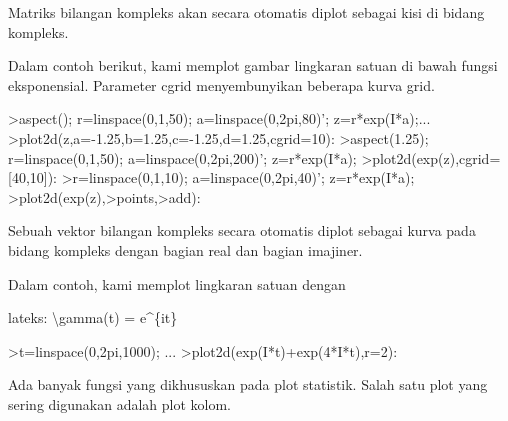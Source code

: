\documentclass[a4paper,10pt]{article}
\begin{document}
\begin{eulernotebook}
\begin{eulercomment}
\begin{eulercomment}
\begin{eulercomment}
\begin{eulercomment}
\begin{eulercomment}
\begin{eulercomment}
\begin{eulercomment}
Matriks bilangan kompleks akan secara otomatis diplot sebagai kisi di
bidang kompleks.

Dalam contoh berikut, kami memplot gambar lingkaran satuan di bawah
fungsi eksponensial. Parameter cgrid menyembunyikan beberapa kurva
grid.
\end{eulercomment}
\begin{eulerprompt}
>aspect(); r=linspace(0,1,50); a=linspace(0,2pi,80)'; z=r*exp(I*a);...
>plot2d(z,a=-1.25,b=1.25,c=-1.25,d=1.25,cgrid=10):
>aspect(1.25); r=linspace(0,1,50); a=linspace(0,2pi,200)'; z=r*exp(I*a);
>plot2d(exp(z),cgrid=[40,10]):
>r=linspace(0,1,10); a=linspace(0,2pi,40)'; z=r*exp(I*a);
>plot2d(exp(z),>points,>add):
\end{eulerprompt}
\begin{eulercomment}
Sebuah vektor bilangan kompleks secara otomatis diplot sebagai kurva
pada bidang kompleks dengan bagian real dan bagian imajiner.

Dalam contoh, kami memplot lingkaran satuan dengan

lateks: \textbackslash{}gamma(t) = e\textasciicircum{}\{it\}
\end{eulercomment}
\begin{eulerprompt}
>t=linspace(0,2pi,1000); ...
>plot2d(exp(I*t)+exp(4*I*t),r=2):
\end{eulerprompt}
\begin{eulercomment}
Ada banyak fungsi yang dikhususkan pada plot statistik. Salah satu
plot yang sering digunakan adalah plot kolom.


\end{eulercomment}
\end{eulercomment}
\end{eulercomment}
\end{eulercomment}
\end{eulercomment}
\end{eulercomment}
\end{eulercomment}
\end{eulernotebook}
\end{document}
